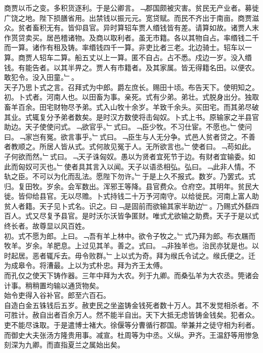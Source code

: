 \documentclass{zhvt-classic}
\begin{document}
\hspace*{2em}商贾以币之变。多积货逐利。于是公卿言。﹁郡国颇被灾害。贫民无产业者。募徙广饶之地。陛下损膳省用。出禁钱以振元元。宽贷赋。而民不齐出于南亩。商贾滋众。贫者畜积无有。皆仰县官。异时算轺车贾人缗钱皆有差。请算如故。诸贾人末作贳贷卖买。居邑稽诸物。及商以取利者。虽无市籍。各以其物自占。率缗钱二千而一算。诸作有租及铸。率缗钱四千一算。非吏比者三老。北边骑士。轺车以一算。商贾人轺车二算。船五丈以上一算。匿不自占。占不悉。戍边一岁。没入缗钱。有能告者。以其半畀之。贾人有市籍者。及其家属。皆无得籍名田。以便农。敢犯令。没入田童。﹂。\\
\hspace*{2em}天子乃思卜式之言。召拜式为中郎。爵左庶长。赐田十顷。布告天下。使明知之。\\
\hspace*{2em}初。卜式者。河南人也。以田畜为事。亲死。式有少弟。弟壮。式脱身出分。独取畜羊百余。田宅财物尽予弟。式入山牧十余岁。羊致千余头。买田宅。而其弟尽破其业。式辄复分予弟者数矣。是时汉方数使将击匈奴。卜式上书。原输家之半县官助边。天子使使问式。﹁欲官乎。﹂式曰。﹁臣少牧。不习仕宦。不愿也。﹂使问曰。﹁家岂有冤。欲言事乎。﹂式曰。﹁臣生与人无分争。式邑人贫者贷之。不善者教顺之。所居人皆从式。式何故见冤于人。无所欲言也。﹂使者曰。﹁苟如此。子何欲而然。﹂式曰。﹁天子诛匈奴。愚以为贤者宜死节于边。有财者宜输委。如此而匈奴可灭也。﹂使者具其言入以闻。天子以语丞相弘。弘曰。﹁此非人情。不轨之臣。不可以为化而乱法。愿陛下勿许。﹂于是上久不报式。数岁。乃罢式。式归。复田牧。岁余。会军数出。浑邪王等降。县官费众。仓府空。其明年。贫民大徙。皆仰给县官。无以尽赡。卜式持钱二十万予河南守。以给徙民。河南上富人助贫人者籍。天子见卜式名。识之。曰﹁是固前而欲输其家半助边﹂。乃赐式外繇四百人。式又尽复予县官。是时沃尓沃皆争匿财。唯式尤欲输之助费。天子于是以式终长者。故尊显以风百姓。\\
\hspace*{2em}初。式不愿为郎。上曰。﹁吾有羊上林中。欲令子牧之。﹂式乃拜为郎。布衣屩而牧羊。岁余。羊肥息。上过见其羊。善之。式曰。﹁非独羊也。治民亦犹是也。以时起居。恶者辄斥去。毋令败群。﹂上以式为奇。拜为缑氏令试之。缑氏便之。迁为成皋令。将漕最。上以为式朴忠。拜为齐王太傅。\\
\hspace*{2em}而孔仅之使天下铸作器。三年中拜为大农。列于九卿。而桑弘羊为大农丞。筦诸会计事。稍稍置均输以通货物矣。\\
\hspace*{2em}始令吏得入谷补官。郎至六百石。\\
\hspace*{2em}自造白金五铢钱后五岁。赦吏民之坐盗铸金钱死者数十万人。其不发觉相杀者。不可胜计。赦自出者百余万人。然不能半自出。天下大抵无虑皆铸金钱矣。犯者众。吏不能尽诛取。于是遣博士褚大。徐偃等分曹循行郡国。举兼并之徒守相为利者。而御史大夫张汤方隆贵用事。减宣。杜周等为中丞。义纵。尹齐。王温舒等用惨急刻深为九卿。而直指夏兰之属始出矣。\\
\end{document}

